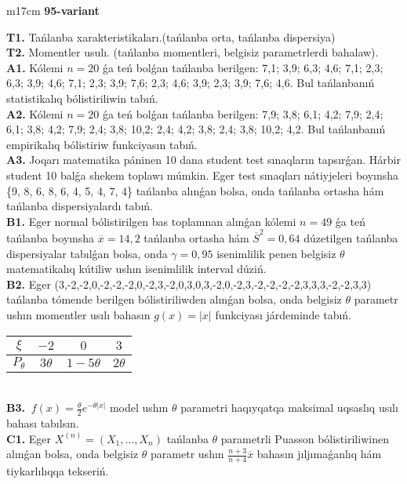 \documentclass{article}
\begin{document}
\begin{tabular}{m{17cm}}
\textbf{95-variant}
\newline

\textbf{T1.} 
Tańlanba xarakteristikaları.(tańlanba orta, tańlanba dispersiya)
 \\
\textbf{T2.} 
Momentler usulı. (tańlanba momentleri, belgisiz parametrlerdi bahalaw).
 \\
\textbf{A1.} 
Kólemi \(n = 20\) ǵa teń bolǵan tańlanba berilgen: 7,1; 3,9; 6,3; 4,6; 7,1; 2,3; 6,3; 3,9; 4,6; 7,1; 2,3; 3,9; 7,6; 2,3; 4,6; 3,9; 2,3; 3,9; 7,6; 4,6. Bul tańlanbanıń statistikalıq bólistiriliwin tabıń.
 \\
\textbf{A2.} 
Kólemi \(n = 20\) ǵa teń bolǵan tańlanba berilgen: 7,9; 3,8; 6,1; 4,2; 7,9; 2,4; 6,1; 3,8; 4,2; 7,9; 2,4; 3,8; 10,2; 2,4; 4,2; 3,8; 2,4; 3,8; 10,2; 4,2. Bul tańlanbanıń empirikalıq bólistiriw funkciyasın tabıń.
 \\
\textbf{A3.} 
Joqarı matematika páninen 10 dana student test sınaqların tapsırǵan. Hárbir student 10 balǵa shekem toplawı múmkin. Eger test sınaqları nátiyjeleri boyınsha \{9, 8, 6, 8, 6, 4, 5, 4, 7, 4\} tańlanba alınǵan bolsa, onda tańlanba ortasha hám tańlanba dispersiyalardı tabıń.
 \\
\textbf{B1.} 
Eger normal bólistirilgen bas toplamnan alınǵan kólemi \(n = 49\) ǵa teń tańlanba boyınsha \(\overline{x} = 14,2\) tańlanba ortasha hám \({\overline{S}}^{2} = 0,64\) dúzetilgen tańlanba dispersiyalar tabılǵan bolsa, onda \(\gamma = 0,95\) isenimlilik penen belgisiz \(\theta\) matematikalıq kútiliw ushın isenimlilik interval dúziń.
 \\
\textbf{B2.} 
Eger (3,-2,-2,0,-2,-2,-2,0,-2,3,-2,0,3,0,3,-2,0,-2,3,-2,-2,-2,-2,3,3,3,-2,-2,3,3) tańlanba tómende berilgen bólistiriliwden alınǵan bolsa, onda belgisiz \(\theta\) parametr ushın momentler usılı bahasın \(g(x) = |x|\) funkciyası járdeminde tabıń.
\begin{tabular}{|c|c|c|c|}
  \hline
$\xi$ &
$- 2$ &
$0$ &
$3$ \\
\hline
\(P_{\theta}\) & \(3\theta\) & \(1 - 5\theta\) & \(2\theta\) \\
\hline
\end{tabular}
 \\
\textbf{B3.} 
\(\ f(x) = \frac{\theta}{2}e^{- \theta|x|}\) model ushın \(\theta\) parametri haqıyqatqa maksimal uqsaslıq usılı bahası tabılsın.
 \\
\textbf{C1.} 
Eger \(X^{(n)} = \left( X_{1},...,X_{n} \right)\) tańlanba \(\theta\) parametrli Puasson bólistiriliwinen alınǵan bolsa, onda belgisiz \(\theta\) parametr ushın \(\frac{n + 3}{n + 4}\overline{x}\) bahasın jıljımaǵanlıq hám tiykarlılıqqa tekseriń.

\end{tabular}
\end{document}
